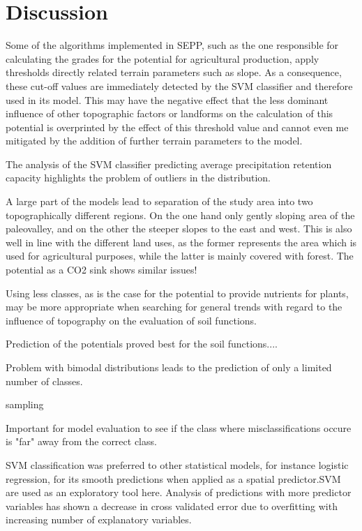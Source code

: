 \documentclass[soilsystems,article,submit,moreauthors,pdftex,10pt,a4paper]{Definitions/mdpi}
\begin{document}
 \section{Discussion}
Some of the algorithms implemented in SEPP, such as the one responsible for calculating the grades for the potential for agricultural production, apply thresholds directly related terrain parameters such as slope. As a consequence, these cut-off values are immediately detected by the SVM classifier  and therefore used in its model. This may have the negative effect that the less dominant influence of other topographic factors or landforms on the calculation of this potential is overprinted by the effect of this threshold value and cannot even me mitigated by the addition of further terrain parameters to the model.

The analysis of the SVM classifier predicting average precipitation retention capacity highlights the problem of outliers in the distribution.

A large part of the models lead to separation of the study area into two topographically different regions. On the one hand only gently sloping area of the paleovalley, and on the other the steeper slopes to the east and west. This is also well in line with the different land uses, as the former represents the area which is used for agricultural purposes, while the latter is mainly covered with forest. The potential as a CO2 sink shows similar issues!
 
Using less classes, as is the case for the potential to provide nutrients for plants, may be more appropriate when searching for general trends with regard to the influence of topography on the evaluation of soil functions.

Prediction of the potentials proved best for the soil functions....


Problem with bimodal distributions leads to the prediction of only a limited number of classes.

sampling

Important for model evaluation to see if the class where misclassifications occure is "far" away from the correct class.

SVM classification was preferred to other statistical models, for instance logistic regression, for its smooth predictions \citep{Steger2016} when applied as a spatial predictor.SVM are used as an exploratory tool here. Analysis of predictions with more predictor variables has shown a decrease in cross validated error due to overfitting with increasing number of explanatory variables.
\end{document}
